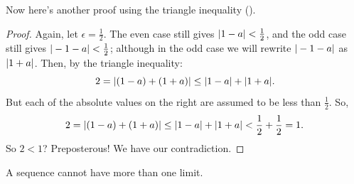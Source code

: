 \documentclass[11pt,twoside=off,numbers=noenddot]{scrbook}
\begin{document}
\begin{example}
\begin{tightfigure}
  \end{tightfigure}

  Now here's another proof using the triangle inequality
  ().

  \begin{proof}
    Again, let $\epsilon = \frac{1}{2}$. The even case still gives
    $| 1 - a | < \frac{1}{2}$, and the odd case still gives
    $| -1 - a | < \frac{1}{2}$; although in the odd case we will
    rewrite $| -1 - a |$ as $| 1 + a |$. Then, by the triangle inequality:
    \[ 2 = | (1 - a) + (1 + a) | \leq | 1 - a | + | 1 + a |. \]
    But each of the absolute values on the right are assumed to be
    less than $\frac{1}{2}$. So,
    \[ 2 = | (1 - a) + (1 + a) | \leq | 1 - a | + | 1 + a | <
    \frac{1}{2} + \frac{1}{2} = 1. \]
    So $2 < 1$? Preposterous! We have our contradiction.
  \end{proof}
\end{example}

\begin{proposition}
  A sequence cannot have more than one limit.
\end{proposition}
\end{document}
